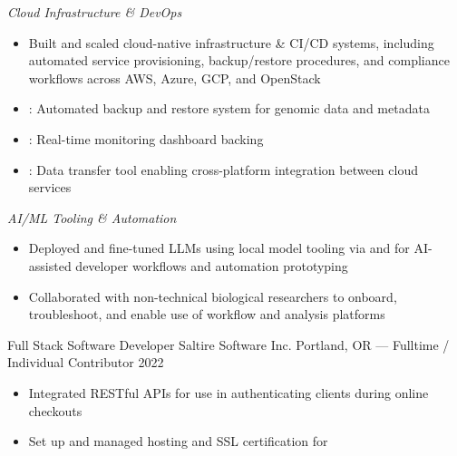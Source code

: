 \vspace{1em}

\emph{Cloud Infrastructure \& DevOps}

\begin{itemize}
    \item Built and scaled cloud-native infrastructure \& CI/CD systems, including automated service provisioning, backup/restore procedures, and compliance workflows across AWS, Azure, GCP, and OpenStack
    \item {}: Automated backup and restore system for genomic data and metadata
    \item {}: Real-time monitoring dashboard backing 
    \item {}: Data transfer tool enabling cross-platform integration between cloud services
\end{itemize}

\vspace{1em}

\emph{AI/ML Tooling \& Automation}

\begin{itemize}
    \item Deployed and fine-tuned LLMs using local model tooling via  and  for AI-assisted developer workflows and automation prototyping
    \item Collaborated with non-technical biological researchers to onboard, troubleshoot, and enable use of workflow and analysis platforms
\end{itemize}

\newpage

\showoff
{Full Stack Software Developer}
{Saltire Software Inc.}
{Portland, OR --- Fulltime / Individual Contributor}
{2022}

\begin{itemize}
    \item Integrated RESTful APIs for use in authenticating clients during online checkouts
    \item Set up and managed hosting and SSL certification for 
\end{itemize}

